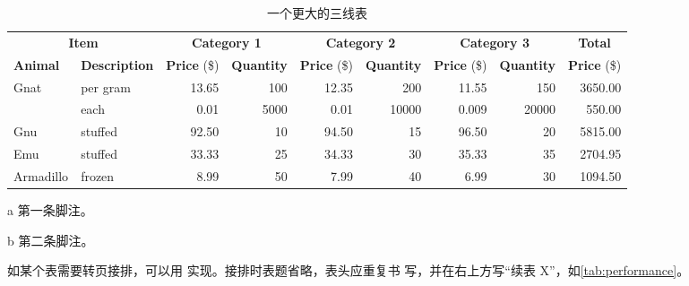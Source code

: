 \begin{table}[!htbp]
\centering
\begin{threeparttable}[b]
\caption{一个更大的三线表}
\label{tab:bigtable}
\begin{tabular}{@{}llrrrrrrr@{}} \toprule
\multicolumn{2}{c}{\textbf{Item}} & \multicolumn{2}{c}{\textbf{Category 1}} & \multicolumn{2}{c}{\textbf{Category 2}} & \multicolumn{2}{c}{\textbf{Category 3}} & \multicolumn{1}{c}{\textbf{Total}} \\ \cmidrule(r){1-2} \cmidrule(lr){3-4} \cmidrule(lr){5-6} \cmidrule(lr){7-8} \cmidrule(l){9-9}
\textbf{Animal} & \textbf{Description} & \textbf{Price} (\$) & \textbf{Quantity} & \textbf{Price} (\$) & \textbf{Quantity} & \textbf{Price} (\$) & \textbf{Quantity} & \textbf{Price} (\$)\\ \midrule
Gnat & per gram\tnote{a} & 13.65 & 100 & 12.35 & 200 & 11.55 & 150 & 3650.00 \\
& each & 0.01 & 5000 & 0.01 & 10000 & 0.009 & 20000 & 550.00 \\
Gnu & stuffed & 92.50 & 10 & 94.50 & 15 & 96.50 & 20 & 5815.00 \\
Emu & stuffed & 33.33 & 25 & 34.33 & 30 & 35.33 & 35 & 2704.95 \\
Armadillo & frozen & 8.99 & 50 & 7.99 & 40 & 6.99 & 30\tnote{b} & 1094.50 \\ \bottomrule
\end{tabular}
\begin{tablenotes}
\item [a] 第一条脚注。
\item [b] 第二条脚注。
\end{tablenotes}
\end{threeparttable}
\end{table}

如某个表需要转页接排，可以用  实现。接排时表题省略，表头应重复书
写，并在右上方写“续表 X”，如\cref{tab:performance}。

